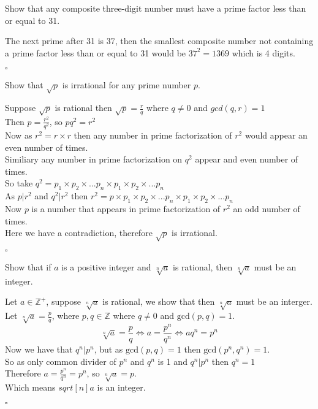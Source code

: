 \documentclass{exam}
\begin{document}
\begin{questions}
    \question Show that any composite three-digit number must have a prime factor less than or equal to 31.
    \begin{solution}
        The next prime after 31 is 37, then the smallest composite number not containing a prime factor less than or equal to 31 would be $37^2 = 1369$ which is 4 digits.
        \begin{flushright}
            $\square$
        \end{flushright}
    \end{solution}

    \question Show that $\sqrt{p}$ is irrational for any prime number $p$.
    \begin{solution}
        Suppose $\sqrt{p}$ is rational then $\sqrt{p} = \frac{r}{q}$ where $q \neq 0$ and $gcd(q,r) = 1$
        \\Then $p = \frac{r^2}{q^2}$, so $pq^2 = r^2$
        \\Now as $r^2 = r \times r$ then any number in prime factorization of $r^2$ would appear an even number of times. 
        \\Similiary any number in prime factorization on $q^2$ appear and even number of times.
        \\So take $q^2 = p_1 \times p_2 \times... p_n \times p_1 \times p_2 \times... p_n$
        \\As $p|r^2$ and $q^2|r^2$ then $r^2 = p \times p_1 \times p_2 \times... p_n \times p_1 \times p_2 \times... p_n$
        \\Now $p$ is a number that appears in prime factorization of $r^2$ an odd number of times.
        \\Here we have a contradiction, therefore $\sqrt{p}$ is irrational.
        \begin{flushright}
            $\square$
        \end{flushright}
    \end{solution}
    
    \question Show that if $a$ is a positive integer and $\sqrt[n]{a}$ is rational, then $\sqrt[n]{a}$ must be an integer.
    \begin{solution}
        Let $a \in \mathbb{Z}^+$, suppose $\sqrt[n]{a}$ is rational, we show that then $\sqrt[n]{a}$ must be an interger.
        \\Let $\sqrt[n]{a} = \frac{p}{q}$, where $p,q \in \mathbb{Z}$ where $q \neq 0$ and $\text{gcd}(p,q) = 1$.
        $$\sqrt[n]{a} = \frac{p}{q} \Leftrightarrow a = \frac{p^n}{q^n} \Leftrightarrow a q^n = p^n$$
        Now we have that $q^n | p^n$, but as $\text{gcd}(p,q) = 1$ then $\text{gcd}(p^n,q^n) = 1$.
        \\So as only common divider of $p^n$ and $q^n$ is 1 and $q^n | p^n$ then $q^n = 1$
        \\Therefore $ a = \frac{p^n}{q^n} = p^n$, so $\sqrt[n]{a} = p$.
        \\Which means $sqrt[n]{a}$ is an integer.
        \begin{flushright}
            $\square$
        \end{flushright}
    \end{solution}
    

\end{questions}
\end{document}

